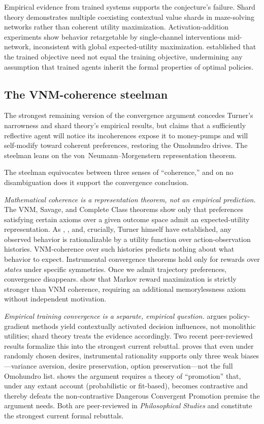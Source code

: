 \documentclass[11pt,a4paper,twocolumn]{article}
\begin{document}
Empirical evidence from trained systems supports the conjecture's
failure. Shard theory \citep{mini2023} demonstrates multiple coexisting
contextual value shards in maze-solving networks rather than coherent
utility maximization. Activation-addition experiments
\citep{turner2023} show behavior retargetable by single-channel
interventions mid-network, inconsistent with global expected-utility
maximization. \citet{hubinger2019} established that the trained objective
need not equal the training objective, undermining any assumption that
trained agents inherit the formal properties of optimal policies.

\subsection{The VNM-coherence steelman}

The strongest remaining version of the convergence argument concedes
Turner's narrowness and shard theory's empirical results, but claims
that a sufficiently reflective agent will notice its incoherences expose
it to money-pumps and will self-modify toward coherent preferences,
restoring the Omohundro drives. The steelman leans on the
von~Neumann--Morgenstern representation theorem.

The steelman equivocates between three senses of ``coherence,'' and on
no disambiguation does it support the convergence conclusion.

\emph{Mathematical coherence is a representation theorem, not an
empirical prediction.} The VNM, Savage, and Complete Class theorems
show only that preferences satisfying certain axioms over a given
outcome space admit an expected-utility representation. As
\citet{ngo2019}, \citet{shah2018}, and, crucially, Turner himself
\citep{turner2022coherent} have established, any observed behavior is
rationalizable by a utility function over action-observation histories.
VNM-coherence over such histories predicts nothing about what behavior
to expect. Instrumental convergence theorems hold only for rewards over
\emph{states} under specific symmetries. Once we admit trajectory
preferences, convergence disappears. \citet{abel2021} show that
Markov reward maximization is strictly stronger than VNM coherence,
requiring an additional memorylessness axiom without independent
motivation.

\emph{Empirical training convergence is a separate, empirical question.}
\citet{turner2022reward} argues policy-gradient methods yield
contextually activated decision influences, not monolithic utilities;
shard theory treats the evidence accordingly. Two recent peer-reviewed
results formalize this into the strongest current rebuttal.
\citet{gallow2024} proves that even under randomly chosen desires,
instrumental rationality supports only three weak biases---variance
aversion, desire preservation, option preservation---not the full
Omohundro list. \citet{sharadin2025} shows the argument requires a
theory of ``promotion'' that, under any extant account (probabilistic
or fit-based), becomes contrastive and thereby defeats the
non-contrastive Dangerous Convergent Promotion premise the argument
needs. Both are peer-reviewed in \emph{Philosophical Studies} and
constitute the strongest current formal rebuttals.
\end{document}
